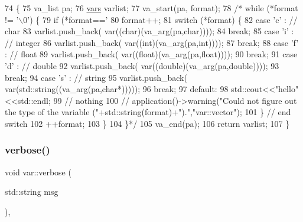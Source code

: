 \begin{DoxyCode}
74                                                   \{
75   va\_list pa;
76   \hyperlink{var_8h_a2a1c35ad624b5ab1fedf9a5719b81b4e}{vars} varlist;
77   va\_start(pa, format);
78 \textcolor{comment}{/*  while (*format != '\(\backslash\)0') \{
}
79 \textcolor{comment}{    if (*format=='%
}
80 \textcolor{comment}{      format++;
}
81 \textcolor{comment}{      switch (*format) \{
}
82 \textcolor{comment}{      case 'c' : // char 
}
83 \textcolor{comment}{        varlist.push\_back( var((char)(va\_arg(pa,char))));
}
84 \textcolor{comment}{        break;
}
85 \textcolor{comment}{      case 'i' : // integer  
}
86 \textcolor{comment}{        varlist.push\_back( var((int)(va\_arg(pa,int))));
}
87 \textcolor{comment}{        break;
}
88 \textcolor{comment}{      case 'f' : // float 
}
89 \textcolor{comment}{        varlist.push\_back( var((float)(va\_arg(pa,float))));
}
90 \textcolor{comment}{        break;
}
91 \textcolor{comment}{      case 'd' : // double 
}
92 \textcolor{comment}{        varlist.push\_back( var((double)(va\_arg(pa,double))));
}
93 \textcolor{comment}{        break;
}
94 \textcolor{comment}{      case 's' : // string
}
95 \textcolor{comment}{        varlist.push\_back( var(std::string((va\_arg(pa,char*)))));
}
96 \textcolor{comment}{        break;
}
97 \textcolor{comment}{      default:
}
98 \textcolor{comment}{    std::cout<<"hello"<<std::endl;
}
99 \textcolor{comment}{    // nothing
}
100 \textcolor{comment}{//        application()->warning("Could not figure out the type of the variable
       ("+std::string(format)+").","var::vector");
}
101 \textcolor{comment}{      \} // end switch 
}
102 \textcolor{comment}{      ++format;
}
103 \textcolor{comment}{    \}
}
104 \textcolor{comment}{  \}*/}
105   va\_end(pa);
106   \textcolor{keywordflow}{return} varlist;
107 \} 
\end{DoxyCode}
\mbox{\label{classvar_a3e079680ce51addea659b23d303ceedc}} 
\subsubsection{\texorpdfstring{verbose()}{verbose()}\hspace{0.1cm}{\footnotesize\ttfamily [1/2]}}
{\footnotesize\ttfamily void var\+::verbose (\begin{DoxyParamCaption}\item[{std\+::string}]{msg }\end{DoxyParamCaption})\hspace{0.3cm}{\ttfamily [inline]}, {\ttfamily [private]}}



